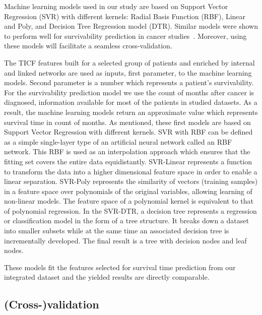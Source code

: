 \documentclass{bmcart}
\begin{document}
Machine learning models used in our study are based on Support Vector
Regression (SVR) with different kernels: Radial Basis Function (RBF),
Linear and Poly, and Decision Tree Regression model (DTR). Similar
models were shown to perform well for survivability prediction in
cancer studies~\cite{19,20}. Moreover, using these models will facilitate a
seamless cross-validation.

The TICF features built for a selected group of patients and enriched by
internal and linked networks are used as inputs, first parameter, to
the machine learning models. Second parameter is a number which
represents a patient{\textquoteright}s survivability. For the
survivability prediction model we use the count of months after cancer
is diagnosed, information available for most of the patients in studied
datasets. As a result, the machine learning models return an
approximate value which represents survival time in count of months. As
mentioned, these first models are based on Support Vector Regression
with different kernels. SVR with RBF can be defined as a simple
single-layer type of an artificial neural network called an RBF
network. This RBF is used as an interpolation approach which ensures
that the fitting set covers the entire data equidistantly. SVR-Linear
represents a function to  transform the data into a higher dimensional
feature space in order to enable a linear separation. SVR-Poly
represents the similarity of vectors (training samples) in a feature
space over polynomials of the original variables, allowing learning of
non-linear models. The feature space of a polynomial kernel is
equivalent to that of polynomial regression. In the SVR-DTR, a decision
tree represents a regression or classification model in the form of a
tree structure. It breaks down a dataset into smaller subsets while at
the same time an associated decision tree is incrementally developed.
The final result is a tree with decision nodes and leaf nodes.

These models fit the features selected for survival time prediction from
our integrated dataset and the yielded results are directly comparable.


\subsection{(Cross-)validation}
\end{document}
